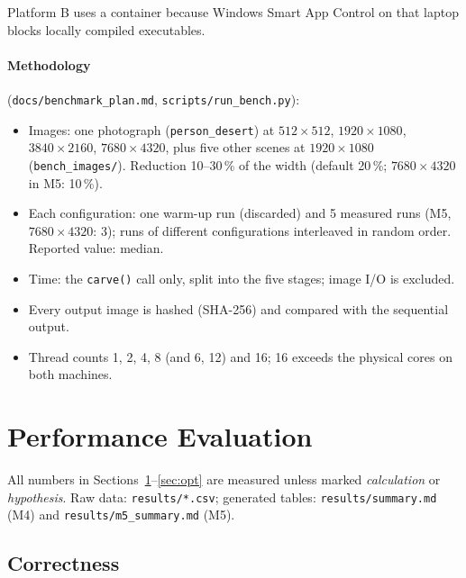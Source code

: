 \documentclass[11pt,a4paper]{article}
\begin{document}
Platform B uses a container because Windows Smart App Control on that laptop blocks locally compiled
executables.

\paragraph{Methodology} (\texttt{docs/benchmark\_plan.md}, \texttt{scripts/run\_bench.py}):
\begin{itemize}
  \item Images: one photograph (\texttt{person\_desert}) at $512\times512$, $1920\times1080$,
    $3840\times2160$, $7680\times4320$, plus five other scenes at $1920\times1080$
    (\texttt{bench\_images/}). Reduction 10--30\,\% of the width (default 20\,\%; $7680\times4320$ in M5:
    10\,\%).
  \item Each configuration: one warm-up run (discarded) and 5 measured runs (M5, $7680\times4320$: 3); runs
    of different configurations interleaved in random order. Reported value: median.
  \item Time: the \texttt{carve()} call only, split into the five stages; image I/O is excluded.
  \item Every output image is hashed (SHA-256) and compared with the sequential output.
  \item Thread counts 1, 2, 4, 8 (and 6, 12) and 16; 16 exceeds the physical cores on both machines.
\end{itemize}

\section{Performance Evaluation}
\label{sec:perf}

All numbers in Sections~\ref{sec:perf}--\ref{sec:opt} are measured unless marked \emph{calculation} or
\emph{hypothesis}. Raw data: \texttt{results/*.csv}; generated tables: \texttt{results/summary.md} (M4)
and \texttt{results/m5\_summary.md} (M5).

\subsection{Correctness}
\end{document}
